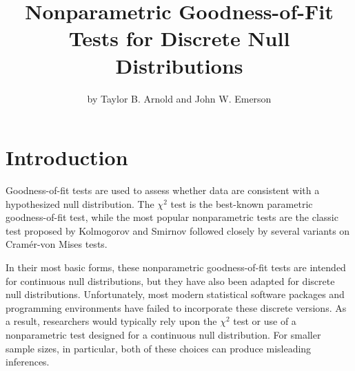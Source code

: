 \title{Nonparametric Goodness-of-Fit Tests for Discrete Null Distributions}
\author{by Taylor B. Arnold and John W. Emerson}

\maketitle




\section{Introduction}

Goodness-of-fit tests are used to assess whether data are consistent
with a hypothesized null distribution.  The $\chi^2$ test is the best-known
parametric goodness-of-fit test, while the most popular nonparametric tests
are the classic test proposed by Kolmogorov and Smirnov followed closely by
several variants on Cram\'{e}r-von Mises tests.



In their most basic forms, these nonparametric goodness-of-fit
tests are intended for continuous null distributions, but they have
also been adapted for discrete null distributions.  Unfortunately,
most modern statistical software packages and programming environments
have failed to incorporate these discrete versions.  As a result,
researchers would typically rely upon the $\chi^2$ test or
use of a nonparametric test designed for a continuous null distribution.
For smaller sample sizes, in particular, both of these choices can produce
misleading inferences.

